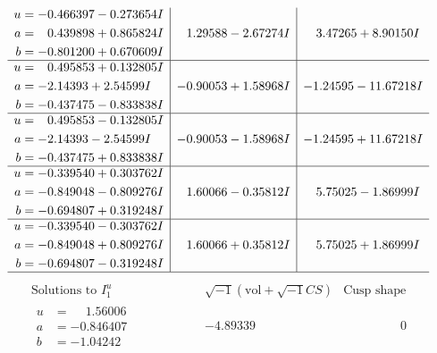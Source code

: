 \documentclass[1p]{elsarticle_modified}
\theoremstyle{definition}
\newcommand{\I}{\sqrt{-1}}
\begin{document}
$$\begin{array}{c|c|c}
\begin{aligned}
u &= -0.466397 - 0.273654 I \\
a &= \phantom{-}0.439898 + 0.865824 I \\
b &= -0.801200 + 0.670609 I\end{aligned}
 & \phantom{-}1.29588 - 2.67274 I & \phantom{-}3.47265 + 8.90150 I \\ \hline\begin{aligned}
u &= \phantom{-}0.495853 + 0.132805 I \\
a &= -2.14393 + 2.54599 I \\
b &= -0.437475 - 0.833838 I\end{aligned}
 & -0.90053 + 1.58968 I & -1.24595 - 11.67218 I \\ \hline\begin{aligned}
u &= \phantom{-}0.495853 - 0.132805 I \\
a &= -2.14393 - 2.54599 I \\
b &= -0.437475 + 0.833838 I\end{aligned}
 & -0.90053 - 1.58968 I & -1.24595 + 11.67218 I \\ \hline\begin{aligned}
u &= -0.339540 + 0.303762 I \\
a &= -0.849048 - 0.809276 I \\
b &= -0.694807 + 0.319248 I\end{aligned}
 & \phantom{-}1.60066 - 0.35812 I & \phantom{-}5.75025 - 1.86999 I \\ \hline\begin{aligned}
u &= -0.339540 - 0.303762 I \\
a &= -0.849048 + 0.809276 I \\
b &= -0.694807 - 0.319248 I\end{aligned}
 & \phantom{-}1.60066 + 0.35812 I & \phantom{-}5.75025 + 1.86999 I\\
 \hline 
 \end{array}$$\newpage$$\begin{array}{c|c|c}  
\text{Solutions to }I^u_{1}& \I (\text{vol} + \sqrt{-1}CS) & \text{Cusp shape}\\
 \hline 
\begin{aligned}
u &= \phantom{-}1.56006\phantom{ +0.000000I} \\
a &= -0.846407\phantom{ +0.000000I} \\
b &= -1.04242\phantom{ +0.000000I}\end{aligned}
 & -4.89339\phantom{ +0.000000I} & \phantom{-0.000000 } 0 \\ \hline\begin{aligned}

\end{aligned}
\end{array}$$
\end{document}
